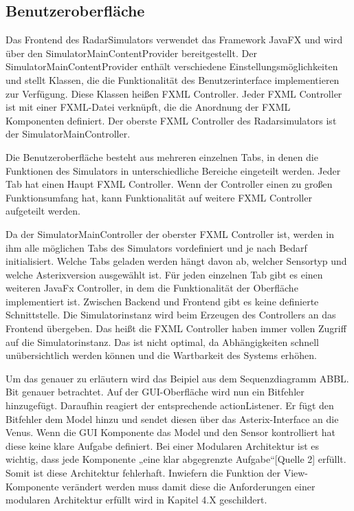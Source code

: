 \subsection{Benutzeroberfläche}
Das Frontend des RadarSimulators verwendet das Framework JavaFX und wird über den SimulatorMainContentProvider bereitgestellt. Der SimulatorMainContentProvider enthält verschiedene Einstellungsmöglichkeiten und stellt Klassen, die die Funktionalität des   Benutzerinterface implementieren zur Verfügung. Diese Klassen heißen FXML Controller. Jeder FXML Controller ist mit einer FXML-Datei verknüpft, die die Anordnung der FXML Komponenten definiert. Der oberste FXML Controller des Radarsimulators ist der SimulatorMainController. 

Die Benutzeroberfläche besteht aus mehreren einzelnen Tabs, in denen die Funktionen des Simulators in unterschiedliche Bereiche eingeteilt werden. Jeder Tab hat einen Haupt FXML Controller. Wenn der Controller einen zu großen Funktionsumfang hat, kann Funktionalität auf weitere FXML Controller aufgeteilt werden. 

Da der SimulatorMainController der oberster FXML Controller ist, werden in ihm alle möglichen Tabs des Simulators vordefiniert und je nach Bedarf initialisiert. Welche Tabs geladen werden hängt davon ab, welcher Sensortyp und welche Asterixversion ausgewählt ist. Für jeden einzelnen Tab gibt es einen weiteren JavaFx Controller, in dem die Funktionalität der Oberfläche implementiert ist. Zwischen Backend und Frontend gibt es keine definierte Schnittstelle. Die Simulatorinstanz wird beim Erzeugen des Controllers an das Frontend übergeben. Das heißt die FXML Controller haben immer vollen Zugriff auf die Simulatorinstanz. Das ist nicht optimal, da Abhängigkeiten schnell unübersichtlich werden können und die Wartbarkeit des Systems erhöhen.

Um das genauer zu erläutern wird das Beipiel aus dem Sequenzdiagramm ABBL. Bit genauer betrachtet. Auf der GUI-Oberfläche wird nun ein Bitfehler hinzugefügt. Daraufhin reagiert der entsprechende actionListener. Er fügt den Bitfehler dem Model hinzu und sendet diesen über das Asterix-Interface an die Venus. Wenn die GUI Komponente das Model und den Sensor kontrolliert hat diese keine klare Aufgabe definiert. Bei einer Modularen Architektur ist es wichtig, dass jede Komponente „eine klar abgegrenzte Aufgabe“[Quelle 2] erfüllt. Somit ist diese Architektur fehlerhaft. Inwiefern die Funktion der View-Komponente verändert werden muss damit diese die Anforderungen einer modularen Architektur erfüllt wird in Kapitel 4.X geschildert.

